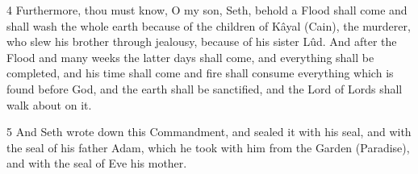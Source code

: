 \par 4 Furthermore, thou must know, O my son, Seth, behold a Flood shall come and shall wash the whole earth because of the children of Kâyal (Cain), the murderer, who slew his brother through jealousy, because of his sister Lûd. And after the Flood and many weeks the latter days shall come, and everything shall be completed, and his time shall come and fire shall consume everything which is found before God, and the earth shall be sanctified, and the Lord of Lords shall walk about on it.

\par 5 And Seth wrote down this Commandment, and sealed it with his seal, and with the seal of his father Adam, which he took with him from the Garden (Paradise), and with the seal of Eve his mother.

